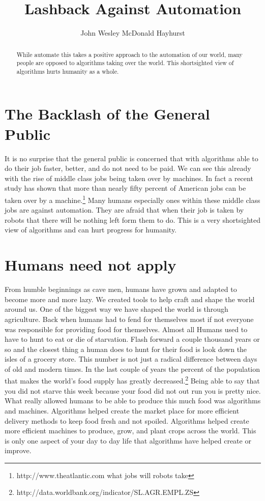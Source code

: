 \documentclass[a4paper,11pt, twocolumn]{article}
\title{Lashback Against Automation}
\author{John Wesley McDonald Hayhurst}
\begin{document}
\maketitle

\begin{abstract} 
While automate this takes a positive approach to the automation of our world, many people are opposed to algorithms taking over the world. This shortsighted view of algorithms hurts humanity as a whole. 
\end{abstract} 
\section{The Backlash of the General Public} 
It is no surprise that the general public is concerned that with algorithms able to do their job faster, better, and do not need to be paid. We can see this already with the rise of middle class jobs being taken over by machines. In fact a recent study has shown that more than nearly fifty percent of American jobs can be taken over by a machine.\footnote{http://www.theatlantic.com what jobs will robots take} Many humans especially ones within these middle class jobs are against automation. They are afraid that when their job is taken by robots that there will be nothing left form them to do. This is a very shortsighted view of algorithms and can hurt progress for humanity. 

\section{Humans need not apply} 
From humble beginnings as cave men, humans have grown and adapted to become more and more lazy. We created tools to help craft and shape the world around us. One of the biggest way we have shaped the world is through agriculture. Back when humans had to fend for themselves most if not everyone was responsible for providing food for themselves. Almost all Humans used to have to hunt to eat or die of starvation. Flash forward a couple thousand years or so and the closest thing a human does to hunt for their food is look down the isles of a grocery store. This number is not just a radical difference between days of old and modern times. In the last couple of years the percent of the population that makes the world's food supply has greatly decreased.\footnote{http://data.worldbank.org/indicator/SL.AGR.EMPL.ZS} Being able to say that you did not starve this week because your food did not out run you is pretty nice. What really allowed humans to be able to produce this much food was algorithms and machines. Algorithms helped create the market place for more efficient delivery methods to keep food fresh and not spoiled. Algorithms helped create more efficient machines to produce, grow, and plant crops across the world. This is only one aspect of your day to day life that algorithms have helped create or improve. 
 
\end{document}
